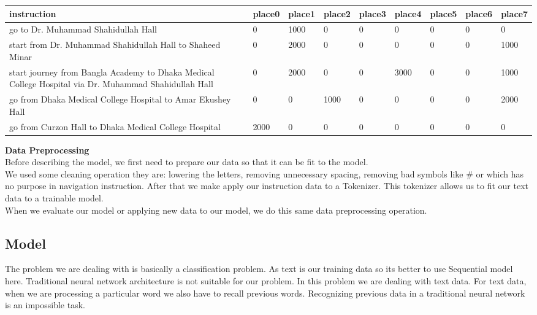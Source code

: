 \begin{longtable}{|l|l|l|l|l|l|l|ll}
    \cline{1-7}
    instruction                                                                                           & place0 & place1 & place2 & place3 & place4 & place5 & place6 & place7 \\ \cline{1-7}
    \endfirsthead
    \endhead
    go to Dr. Muhammad Shahidullah Hall                                                                   & 0      & 1000   & 0      & 0      & 0      & 0      & 0      & 0      \\ \cline{1-7}
    start from Dr. Muhammad Shahidullah Hall to Shaheed Minar                                             & 0      & 2000   & 0      & 0      & 0      & 0      & 0      & 1000   \\ \cline{1-7}
    start journey from Bangla Academy to Dhaka Medical College Hospital via Dr. Muhammad Shahidullah Hall & 0      & 2000   & 0      & 0      & 3000   & 0      & 0      & 1000   \\ \cline{1-7}
    go from Dhaka Medical College Hospital to Amar Ekushey Hall                                           & 0      & 0      & 1000   & 0      & 0      & 0      & 0      & 2000   \\ \cline{1-7}
    go from Curzon Hall to Dhaka Medical College Hospital                                                 & 2000   & 0      & 0      & 0      & 0      & 0      & 0      & 0      \\ \cline{1-7}
\end{longtable}

\textbf{Data Preprocessing} \\
Before describing the model, we first need to prepare our data so that it can be fit to the model. \\

We used some cleaning operation they are: lowering the letters, removing unnecessary spacing, removing bad symbols like \# or \text{*} which has no purpose in navigation instruction. After that we make apply our instruction data to a Tokenizer. This tokenizer allows us to fit our text data to a trainable model. \\

When we evaluate our model or applying new data to our model, we do this same data preprocessing operation. \\


\subsection{Model}
The problem we are dealing with is basically a classification problem. As text is our training data so its better to use Sequential model here. Traditional neural network architecture is not suitable for our problem. In this problem we are dealing with text data. For text data, when we are processing a particular word we also have to recall previous words. Recognizing previous data in a traditional neural network is an impossible task.\\

